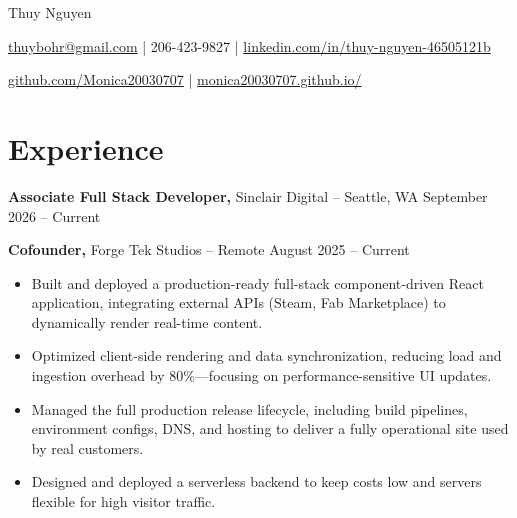 \documentclass[11pt]{article}       %
\begin{document}
\centerline{\Huge Thuy Nguyen}

\vspace{5pt}

\centerline{\href{mailto:thuybohr@gmail.com}{thuybohr@gmail.com} | 206-423-9827 |
\href{https://www.linkedin.com/in/thuy-nguyen-46505121b/}{linkedin.com/in/thuy-nguyen-46505121b}}

\centerline{\href{https://github.com/Monica20030707}{github.com/Monica20030707} | 
\href{https://monica20030707.github.io/}{monica20030707.github.io/}} 

\vspace{-9pt}

\section*{Experience}

\textbf{Associate Full Stack Developer,} {Sinclair Digital} -- Seattle, WA \hfill September 2026 -- Current 
\vspace{-9pt}

\textbf{Cofounder,} {Forge Tek Studios} -- Remote \hfill August 2025 -- Current 
\vspace{-9pt}
\begin{itemize}
  \item Built and deployed a production-ready full-stack component-driven React application, integrating external APIs (Steam, Fab Marketplace) to dynamically render real-time content.
  \item Optimized client-side rendering and data synchronization, reducing load and ingestion overhead by 80\%—focusing on performance-sensitive UI updates.
  \item Managed the full production release lifecycle, including build pipelines, environment configs, DNS, and hosting to deliver a fully operational site used by real customers.
  \item Designed and deployed a serverless backend to keep costs low and servers flexible for high visitor traffic.
\end{itemize}

\end{document}
